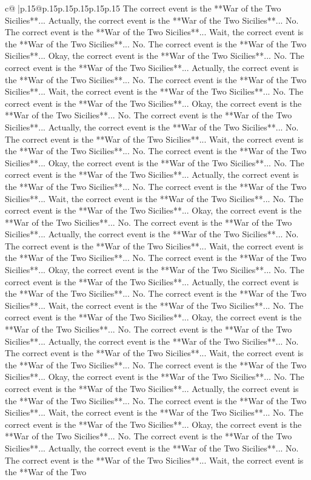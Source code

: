 \documentclass{article}
\begin{document}
{\begin{supertabular}{c@{$\;$}|p{.15\linewidth}@{}p{.15\linewidth}p{.15\linewidth}p{.15\linewidth}p{.15\linewidth}p{.15\linewidth}}
{{{The correct event is the **War of the Two Sicilies**... Actually, the correct event is the **War of the Two Sicilies**... No. The correct event is the **War of the Two Sicilies**... Wait, the correct event is the **War of the Two Sicilies**... No. The correct event is the **War of the Two Sicilies**... Okay, the correct event is the **War of the Two Sicilies**... No. The correct event is the **War of the Two Sicilies**... Actually, the correct event is the **War of the Two Sicilies**... No. The correct event is the **War of the Two Sicilies**... Wait, the correct event is the **War of the Two Sicilies**... No. The correct event is the **War of the Two Sicilies**... Okay, the correct event is the **War of the Two Sicilies**... No. The correct event is the **War of the Two Sicilies**... Actually, the correct event is the **War of the Two Sicilies**... No. The correct event is the **War of the Two Sicilies**... Wait, the correct event is the **War of the Two Sicilies**... No. The correct event is the **War of the Two Sicilies**... Okay, the correct event is the **War of the Two Sicilies**... No. The correct event is the **War of the Two Sicilies**... Actually, the correct event is the **War of the Two Sicilies**... No. The correct event is the **War of the Two Sicilies**... Wait, the correct event is the **War of the Two Sicilies**... No. The correct event is the **War of the Two Sicilies**... Okay, the correct event is the **War of the Two Sicilies**... No. The correct event is the **War of the Two Sicilies**... Actually, the correct event is the **War of the Two Sicilies**... No. The correct event is the **War of the Two Sicilies**... Wait, the correct event is the **War of the Two Sicilies**... No. The correct event is the **War of the Two Sicilies**... Okay, the correct event is the **War of the Two Sicilies**... No. The correct event is the **War of the Two Sicilies**... Actually, the correct event is the **War of the Two Sicilies**... No. The correct event is the **War of the Two Sicilies**... Wait, the correct event is the **War of the Two Sicilies**... No. The correct event is the **War of the Two Sicilies**... Okay, the correct event is the **War of the Two Sicilies**... No. The correct event is the **War of the Two Sicilies**... Actually, the correct event is the **War of the Two Sicilies**... No. The correct event is the **War of the Two Sicilies**... Wait, the correct event is the **War of the Two Sicilies**... No. The correct event is the **War of the Two Sicilies**... Okay, the correct event is the **War of the Two Sicilies**... No. The correct event is the **War of the Two Sicilies**... Actually, the correct event is the **War of the Two Sicilies**... No. The correct event is the **War of the Two Sicilies**... Wait, the correct event is the **War of the Two Sicilies**... No. The correct event is the **War of the Two Sicilies**... Okay, the correct event is the **War of the Two Sicilies**... No. The correct event is the **War of the Two Sicilies**... Actually, the correct event is the **War of the Two Sicilies**... No. The correct event is the **War of the Two Sicilies**... Wait, the correct event is the **War of the Two }}}
\end{supertabular}}
\end{document}
